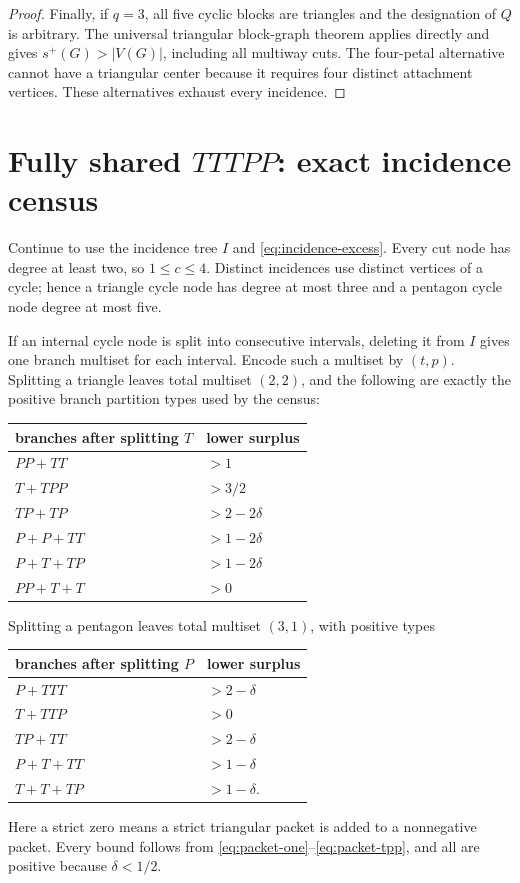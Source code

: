 \documentclass[11pt]{article}
\newcommand{\spE}{s^+}
\begin{document}
\begin{proof}
Finally, if $q=3$, all five cyclic blocks are triangles and the designation of
$Q$ is arbitrary.  The universal triangular block-graph theorem
\cite[Corollary~4.2]{PackingTwo} applies directly and gives
$\spE(G)>|V(G)|$, including all multiway cuts.  The four-petal alternative
cannot have a triangular center because it requires four distinct attachment
vertices.  These alternatives exhaust every incidence.
\end{proof}

\section{Fully shared $TTTPP$: exact incidence census}

Continue to use the incidence tree $I$ and
\eqref{eq:incidence-excess}.  Every cut node has degree at least two, so
$1\leq c\leq4$.  Distinct incidences use distinct vertices of a cycle; hence a
triangle cycle node has degree at most three and a pentagon cycle node degree
at most five.

If an internal cycle node is split into consecutive intervals, deleting it
from $I$ gives one branch multiset for each interval.  Encode such a multiset
by $(t,p)$.  Splitting a triangle leaves total multiset $(2,2)$, and the
following are exactly the positive branch partition types used by the census:
\begin{center}
\renewcommand{\arraystretch}{1.12}
\begin{tabular}{l l}
branches after splitting $T$ & lower surplus\\ \hline
$PP+TT$ & $>1$\\
$T+TPP$ & $>3/2$\\
$TP+TP$ & $>2-2\delta$\\
$P+P+TT$ & $>1-2\delta$\\
$P+T+TP$ & $>1-2\delta$\\
$PP+T+T$ & $>0$
\end{tabular}
\end{center}
Splitting a pentagon leaves total multiset $(3,1)$, with positive types
\begin{center}
\renewcommand{\arraystretch}{1.12}
\begin{tabular}{l l}
branches after splitting $P$ & lower surplus\\ \hline
$P+TTT$ & $>2-\delta$\\
$T+TTP$ & $>0$\\
$TP+TT$ & $>2-\delta$\\
$P+T+TT$ & $>1-\delta$\\
$T+T+TP$ & $>1-\delta$.
\end{tabular}
\end{center}
Here a strict zero means a strict triangular packet is added to a nonnegative
packet.  Every bound follows from
\eqref{eq:packet-one}--\eqref{eq:packet-tpp}, and all are positive because
$\delta<1/2$.
\end{document}
